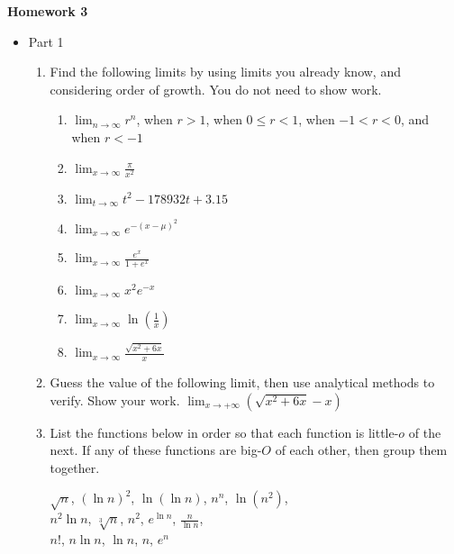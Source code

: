 \documentclass{article}
\begin{document}
\begin{center}
    \large \textbf{Homework 3}
\end{center}
        \begin{itemize}
            \item Part 1
                \begin{enumerate}


    	\item Find the following limits by using limits you already know, and considering order of growth. You do not need to show work.
    	    \begin{enumerate}
    	        \item $\displaystyle \lim_{n \rightarrow \infty} r^n$, when $r > 1$, when $0\leq r<1$, when $-1 < r < 0$, and when $r < -1$
    	        \item $\displaystyle \lim_{x\rightarrow \infty} \frac{\pi}{x^2}$
    	        \item $\displaystyle \lim_{t\rightarrow \infty} t^2-178932t+3.15$
    	        \item $\displaystyle \lim_{x\rightarrow \infty} e^{-(x-\mu)^2}$
    	        \item $\displaystyle \lim_{x\rightarrow \infty} \frac{e^x}{1+e^x}$
    	        \item $\displaystyle \lim_{x\rightarrow \infty} x^2e^{-x}$
    	        \item $\displaystyle \lim_{x\rightarrow \infty} \ln \left(\frac{1}{x}\right)$ 
    	        \item $\displaystyle \lim_{x\rightarrow \infty} \frac{\sqrt{x^2+6x}}{x}$
    	    \end{enumerate}
    	     \item Guess the value of the following limit, then use analytical methods to verify. Show your work. $\displaystyle \lim_{x \rightarrow +\infty} (\sqrt{x^2+6x}-x)$ 
        	
    	\item List the functions below in order so that each function is little-$o$ of the next. If any of these functions are big-$O$ of each other, then group them together.
\begin{center}
$\displaystyle \sqrt{n}$,
$\displaystyle (\ln{n})^2$,
$\displaystyle \ln\left(\ln{n}\right)$, 
$\displaystyle n^{n}$,
$\displaystyle \ln{(n^2)}$,\\
$\displaystyle n^2\ln{n}$,
$\displaystyle \sqrt[3]{n}$,
$\displaystyle n^2$,
$\displaystyle e^{\ln n}$,
$\displaystyle \frac{n}{\ln{n}}$,\\
$\displaystyle n!$,
$\displaystyle n\ln n$,
$\displaystyle \ln{n}$,
$\displaystyle n$,
$\displaystyle e^n$
\end{center}




\end{enumerate}
\end{itemize}
\end{document}
